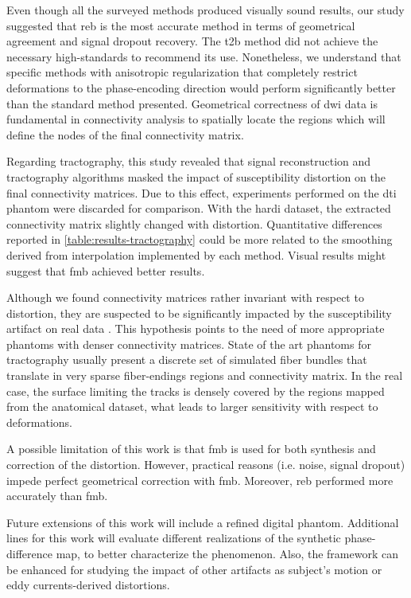 Even though all the surveyed methods produced visually 
sound results, our study suggested that \gls*{reb} is the 
most accurate method in terms of geometrical agreement and
signal dropout recovery. 
The \gls*{t2b} method did not achieve the necessary high-standards
to recommend its use. Nonetheless, we understand that specific
methods with anisotropic regularization that completely
restrict deformations to the phase-encoding direction would perform
significantly better than the standard method presented.
Geometrical correctness of \gls*{dwi} data is fundamental 
in connectivity analysis to spatially locate the
regions which will define the nodes of the final connectivity
matrix.

Regarding tractography, this study revealed that signal
reconstruction and tractography algorithms masked the 
impact of susceptibility distortion on the final connectivity
matrices. Due to this effect, experiments performed on 
the \gls*{dti} phantom were discarded for comparison.
With the \gls*{hardi} dataset, the extracted 
connectivity matrix slightly
changed with distortion. Quantitative differences reported in
\autoref{table:results-tractography} could be more related
to the smoothing derived from interpolation implemented by
each method. Visual results might suggest that \gls*{fmb}
achieved better results.

Although we found connectivity matrices rather invariant with
respect to distortion, they are suspected to be significantly
impacted by the susceptibility artifact on real data 
\cite{irfanoglu_effects_2012}.
This hypothesis points to the need of more appropriate 
phantoms with denser connectivity matrices.
State of the art phantoms for tractography usually present a
discrete set of simulated fiber bundles that translate in 
very sparse fiber-endings regions and connectivity matrix.
In the real case, the surface limiting the tracks is densely 
covered by the regions mapped from the anatomical 
dataset, what leads to larger sensitivity with respect to
deformations.

A possible limitation of this work is that \gls*{fmb} is
used for both synthesis and correction of the distortion.
However, practical reasons (i.e. noise, signal dropout)
impede perfect geometrical correction with \gls*{fmb}.
Moreover, \gls*{reb} performed more accurately 
than \gls*{fmb}.

Future extensions of this work will include a 
refined digital phantom. Additional lines for this
work will evaluate different realizations of the 
synthetic phase-difference map, to better characterize
the phenomenon. Also, the framework can be enhanced 
for studying the impact of other artifacts as 
subject's motion or eddy currents-derived distortions.